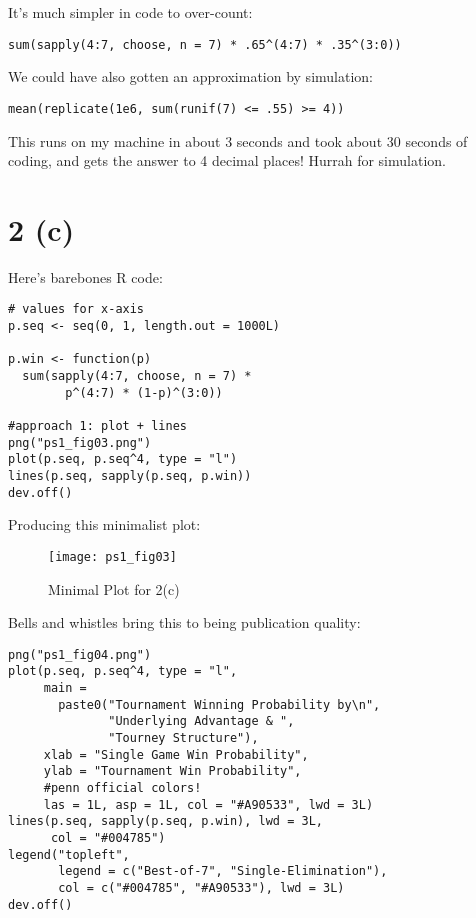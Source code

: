 \documentclass{article}
\begin{document}
It's much simpler in code to over-count:

\begin{lstlisting}
sum(sapply(4:7, choose, n = 7) * .65^(4:7) * .35^(3:0))
\end{lstlisting}

We could have also gotten an approximation by simulation:

\begin{lstlisting}
mean(replicate(1e6, sum(runif(7) <= .55) >= 4))
\end{lstlisting}

This runs on my machine in about 3 seconds and took about 30 seconds of coding, and gets the answer to 4 decimal places! Hurrah for simulation.

\section{2 (c)} 

Here's barebones R code:

\begin{lstlisting}
# values for x-axis
p.seq <- seq(0, 1, length.out = 1000L)

p.win <- function(p) 
  sum(sapply(4:7, choose, n = 7) *
        p^(4:7) * (1-p)^(3:0))

#approach 1: plot + lines
png("ps1_fig03.png")
plot(p.seq, p.seq^4, type = "l")
lines(p.seq, sapply(p.seq, p.win))
dev.off()
\end{lstlisting}

Producing this minimalist plot:

\begin{figure}[htbp]
\centering
\texttt{[image: ps1\_fig03]}
\caption{Minimal Plot for 2(c)}
\label{fig:prob}
\end{figure}

Bells and whistles bring this to being publication quality:

\begin{lstlisting}
png("ps1_fig04.png")
plot(p.seq, p.seq^4, type = "l",
     main = 
       paste0("Tournament Winning Probability by\n",
              "Underlying Advantage & ", 
              "Tourney Structure"),
     xlab = "Single Game Win Probability",
     ylab = "Tournament Win Probability",
     #penn official colors!
     las = 1L, asp = 1L, col = "#A90533", lwd = 3L)
lines(p.seq, sapply(p.seq, p.win), lwd = 3L,
      col = "#004785")
legend("topleft", 
       legend = c("Best-of-7", "Single-Elimination"),
       col = c("#004785", "#A90533"), lwd = 3L)
dev.off()
\end{lstlisting}
\end{document}
